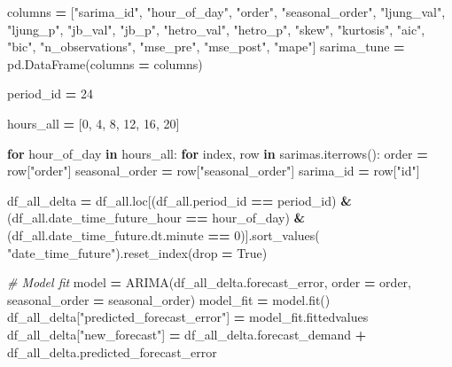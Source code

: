 \documentclass[mstat,12pt]{unswthesis}
\newenvironment{Shaded}{\begin{snugshade}}{\end{snugshade}}
\newcommand{\CommentTok}[1]{\textcolor[rgb]{0.56,0.35,0.01}{\textit{#1}}}
\newcommand{\ControlFlowTok}[1]{\textcolor[rgb]{0.13,0.29,0.53}{\textbf{#1}}}
\newcommand{\DecValTok}[1]{\textcolor[rgb]{0.00,0.00,0.81}{#1}}
\newcommand{\KeywordTok}[1]{\textcolor[rgb]{0.13,0.29,0.53}{\textbf{#1}}}
\newcommand{\NormalTok}[1]{#1}
\newcommand{\OperatorTok}[1]{\textcolor[rgb]{0.81,0.36,0.00}{\textbf{#1}}}
\newcommand{\StringTok}[1]{\textcolor[rgb]{0.31,0.60,0.02}{#1}}
\newcommand{\VariableTok}[1]{\textcolor[rgb]{0.00,0.00,0.00}{#1}}
\begin{document}
\begin{Shaded}
\begin{Highlighting}[]
\NormalTok{columns }\OperatorTok{=}\NormalTok{ [}\StringTok{"sarima\_id"}\NormalTok{, }\StringTok{"hour\_of\_day"}\NormalTok{, }\StringTok{"order"}\NormalTok{, }\StringTok{"seasonal\_order"}\NormalTok{, }
    \StringTok{"ljung\_val"}\NormalTok{, }\StringTok{"ljung\_p"}\NormalTok{, }\StringTok{"jb\_val"}\NormalTok{, }\StringTok{"jb\_p"}\NormalTok{, }\StringTok{"hetro\_val"}\NormalTok{, }\StringTok{"hetro\_p"}\NormalTok{, }
    \StringTok{"skew"}\NormalTok{, }\StringTok{"kurtosis"}\NormalTok{, }\StringTok{"aic"}\NormalTok{, }\StringTok{"bic"}\NormalTok{, }\StringTok{"n\_observations"}\NormalTok{, }\StringTok{"mse\_pre"}\NormalTok{, }
    \StringTok{"mse\_post"}\NormalTok{, }\StringTok{"mape"}\NormalTok{]}
\NormalTok{sarima\_tune }\OperatorTok{=}\NormalTok{ pd.DataFrame(columns }\OperatorTok{=}\NormalTok{ columns)}

\NormalTok{period\_id }\OperatorTok{=} \DecValTok{24}

\NormalTok{hours\_all }\OperatorTok{=}\NormalTok{ [}\DecValTok{0}\NormalTok{, }\DecValTok{4}\NormalTok{, }\DecValTok{8}\NormalTok{, }\DecValTok{12}\NormalTok{, }\DecValTok{16}\NormalTok{, }\DecValTok{20}\NormalTok{]}

\ControlFlowTok{for}\NormalTok{ hour\_of\_day }\KeywordTok{in}\NormalTok{ hours\_all:}
    \ControlFlowTok{for}\NormalTok{ index, row }\KeywordTok{in}\NormalTok{ sarimas.iterrows():}
\NormalTok{        order }\OperatorTok{=}\NormalTok{ row[}\StringTok{"order"}\NormalTok{]}
\NormalTok{        seasonal\_order }\OperatorTok{=}\NormalTok{ row[}\StringTok{"seasonal\_order"}\NormalTok{]}
\NormalTok{        sarima\_id }\OperatorTok{=}\NormalTok{ row[}\StringTok{"id"}\NormalTok{]}

\NormalTok{        df\_all\_delta }\OperatorTok{=}\NormalTok{ df\_all.loc[(df\_all.period\_id }\OperatorTok{==}\NormalTok{ period\_id) }\OperatorTok{\&} 
\NormalTok{        (df\_all.date\_time\_future\_hour }\OperatorTok{==}\NormalTok{ hour\_of\_day) }\OperatorTok{\&} 
\NormalTok{        (df\_all.date\_time\_future.dt.minute }\OperatorTok{==} \DecValTok{0}\NormalTok{)].sort\_values(}
            \StringTok{"date\_time\_future"}\NormalTok{).reset\_index(drop }\OperatorTok{=} \VariableTok{True}\NormalTok{)}

        \CommentTok{\# Model fit}
\NormalTok{        model }\OperatorTok{=}\NormalTok{ ARIMA(df\_all\_delta.forecast\_error, order }\OperatorTok{=}\NormalTok{ order, }
\NormalTok{            seasonal\_order }\OperatorTok{=}\NormalTok{ seasonal\_order)}
\NormalTok{        model\_fit }\OperatorTok{=}\NormalTok{ model.fit()}
\NormalTok{        df\_all\_delta[}\StringTok{"predicted\_forecast\_error"}\NormalTok{] }\OperatorTok{=}\NormalTok{ model\_fit.fittedvalues}
\NormalTok{        df\_all\_delta[}\StringTok{"new\_forecast"}\NormalTok{] }\OperatorTok{=}\NormalTok{ df\_all\_delta.forecast\_demand }\OperatorTok{+} 
\NormalTok{            df\_all\_delta.predicted\_forecast\_error}


\end{Highlighting}
\end{Shaded}
\end{document}
